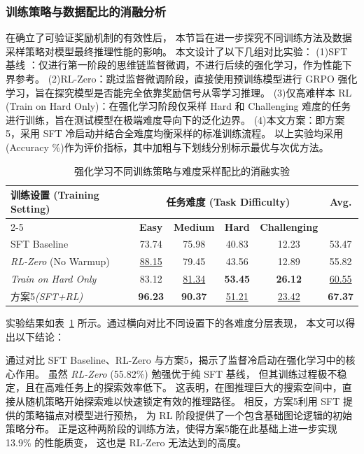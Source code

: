 \subsubsection{训练策略与数据配比的消融分析}
\label{subsec:training_strategy}

在确立了可验证奖励机制的有效性后，
本节旨在进一步探究不同训练方法及数据采样策略对模型最终推理性能的影响。
本文设计了以下几组对比实验：
(1)SFT 基线 ：仅进行第一阶段的思维链监督微调，不进行后续的强化学习，作为性能下界参考。
(2)RL-Zero：跳过监督微调阶段，直接使用预训练模型进行 GRPO 强化学习，旨在探究模型是否能完全依靠奖励信号从零学习推理。
(3){仅高难样本 RL (Train on Hard Only)}：在强化学习阶段仅采样 Hard 和 Challenging 难度的任务进行训练，旨在测试模型在极端难度导向下的泛化边界。
(4)本文方案：即方案5，采用 SFT 冷启动并结合全难度均衡采样的标准训练流程。
以上实验均采用(Accuracy \%)作为评价指标，其中加粗与下划线分别标示最优与次优方法。

\begin{table}[htbp]
\centering
\caption{强化学习不同训练策略与难度采样配比的消融实验}
\label{tab:strategy_ablation}
\small
\setlength{\tabcolsep}{8pt}
\renewcommand{\arraystretch}{1.25}
\begin{tabular}{lccccc}
\toprule
\multirow{2}{*}{\textbf{训练设置 (Training Setting)}} & \multicolumn{4}{c}{\textbf{任务难度 (Task Difficulty)}} & \multirow{2}{*}{\textbf{Avg.}} \\
\cmidrule(lr){2-5}
& \textbf{Easy} & \textbf{Medium} & \textbf{Hard} & \textbf{Challenging} & \\
\midrule
SFT Baseline & 73.74 & 75.98 & 40.83 & 12.23 & 53.47 \\
\textit{RL-Zero} (No Warmup) & \underline{88.15} & 79.45 & 43.56 & 12.89 & 55.82 \\
\textit{Train on Hard Only} & 83.12 & \underline{81.34} & \textbf{53.45} & \textbf{26.12} & \underline{60.55} \\
方案5\textit{(SFT+RL)} & \textbf{96.23} & \textbf{90.37} & \underline{ 51.21} & \underline{23.42} & \textbf{67.37} \\
\bottomrule
\end{tabular}
\end{table}

实验结果如表~\ref{tab:strategy_ablation} 所示。通过横向对比不同设置下的各难度分层表现，
本文可以得出以下结论：


通过对比 SFT Baseline、RL-Zero 与方案5，揭示了监督冷启动在强化学习中的核心作用。
虽然 \textit{RL-Zero} (55.82\%) 勉强优于纯 SFT 基线，
但其训练过程极不稳定，且在高难任务上的探索效率低下。
这表明，在图推理巨大的搜索空间中，直接从随机策略开始探索难以快速锁定有效的推理路径。
相反，方案5利用 SFT 提供的策略锚点对模型进行预热，
为 RL 阶段提供了一个包含基础图论逻辑的初始策略分布。
正是这种两阶段的训练方法，使得方案5能在此基础上进一步实现 13.9\% 的性能质变，
这也是 RL-Zero 无法达到的高度。

